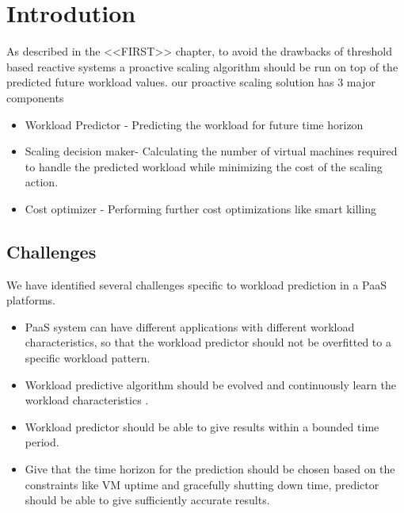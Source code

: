 \section{Introdution}


As described in the <<FIRST>> chapter, to avoid the drawbacks of threshold based reactive systems a proactive scaling algorithm should be run on top of the predicted future workload values. our proactive scaling solution has 3 major components

\begin{itemize}
\item Workload Predictor - Predicting the workload for future time horizon
\end{itemize}

\begin{itemize}
\item Scaling decision maker- Calculating the number of virtual machines required to handle the predicted workload while minimizing the cost of the scaling action.
\end{itemize}

\begin{itemize}
\item Cost optimizer - Performing further cost optimizations like smart killing
\end{itemize}

\usepackage{multirow}


\subsection{Challenges}

We have identified several challenges specific to workload prediction in a PaaS platforms.
\begin{itemize}
\item PaaS system can have different applications with different workload characteristics, so that the workload predictor should not be overfitted to a specific workload pattern.
\end{itemize}
\begin{itemize}
\item Workload predictive algorithm should be evolved and continuously learn the workload characteristics . 
\end{itemize}
\begin{itemize}
\item Workload predictor should be able to give results within a bounded time period.
\end{itemize}
\begin{itemize}
\item Give that the  time horizon for the prediction should be chosen based on the constraints like VM uptime and gracefully shutting down time, predictor should be able to give sufficiently accurate results.
\end{itemize}


